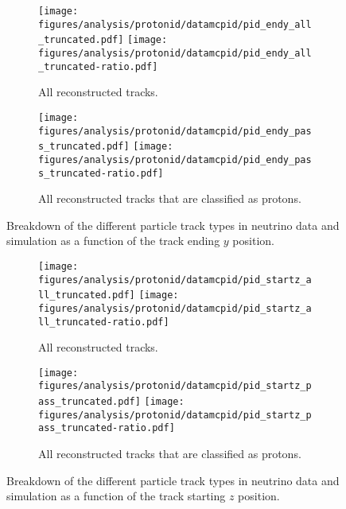     \begin{figure}[h]
      \centering
      \begin{subfigure}[t]{2.8in}
        \texttt{[image: figures/analysis/protonid/datamcpid/pid\_endy\_all\_truncated.pdf]}
        \texttt{[image: figures/analysis/protonid/datamcpid/pid\_endy\_all\_truncated-ratio.pdf]}
        \caption{All reconstructed tracks.}
      \end{subfigure}
      \hspace{2pt}
      \begin{subfigure}[t]{2.8in}
        \texttt{[image: figures/analysis/protonid/datamcpid/pid\_endy\_pass\_truncated.pdf]}
        \texttt{[image: figures/analysis/protonid/datamcpid/pid\_endy\_pass\_truncated-ratio.pdf]}
        \caption{All reconstructed tracks that are classified as protons.}
      \end{subfigure}
      \caption{Breakdown of the different particle track types in neutrino data
      and simulation as a function of the track ending $y$ position.}
      \label{fig:pidendy}
    \end{figure}
    \begin{figure}[h]
      \centering
      \begin{subfigure}[t]{2.8in}
        \texttt{[image: figures/analysis/protonid/datamcpid/pid\_startz\_all\_truncated.pdf]}
        \texttt{[image: figures/analysis/protonid/datamcpid/pid\_startz\_all\_truncated-ratio.pdf]}
        \caption{All reconstructed tracks.}
      \end{subfigure}
      \hspace{2pt}
      \begin{subfigure}[t]{2.8in}
        \texttt{[image: figures/analysis/protonid/datamcpid/pid\_startz\_pass\_truncated.pdf]}
        \texttt{[image: figures/analysis/protonid/datamcpid/pid\_startz\_pass\_truncated-ratio.pdf]}
        \caption{All reconstructed tracks that are classified as protons.}
      \end{subfigure}
      \caption{Breakdown of the different particle track types in neutrino data
      and simulation as a function of the track starting $z$ position.}
      \label{fig:pidstartz}
    \end{figure}
